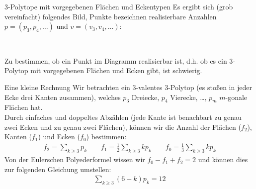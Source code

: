 \documentclass[10pt, notheorems]{beamer}
\begin{document}
\begin{frame}{$3$-Polytope mit vorgegebenen Flächen und Eckentypen}
  Es ergibt sich (grob vereinfacht) folgendes Bild, Punkte bezeichnen realisierbare Anzahlen $p = (p_3, p_4, \dots)$ und $v = (v_3, v_4, \dots)$:

  \vspace{0.5cm}
  { \centering
    \\
  }
  \vspace{0.5cm}
  \pause
  Zu bestimmen, ob ein Punkt im Diagramm realisierbar ist, d.h. ob es ein $3$-Polytop mit vorgegebenen Flächen und Ecken gibt, ist schwierig.
\end{frame}

\begin{frame}{Eine kleine Rechnung}
  Wir betrachten ein $3$-valentes $3$-Polytop (es stoßen in jeder Ecke drei Kanten zusammen), welches $p_3$ Dreiecke, $p_4$ Vierecke, \dots, $p_m$ $m$-gonale Flächen hat.\\
  \medskip
  \pause
  Durch  einfaches und doppeltes Abzählen (jede Kante ist benachbart zu genau zwei Ecken und zu genau zwei Flächen), können wir die Anzahl der Flächen ($f_2$), Kanten ($f_1$) und Ecken ($f_0$) bestimmen:
  \begin{align*}
    f_2 = \sum_{k \geq 3} p_k \qquad f_1 = \tfrac{1}{2}\sum_{k \geq 3} k p_k \qquad f_0 = \tfrac{1}{3}\sum_{k \geq 3} k p_k
  \end{align*}
  \pause
  Von der {\sc Euler}schen Polyederformel wissen wir $f_0 - f_1 + f_2 = 2$ und können dies zur folgenden Gleichung umstellen:
  \begin{align*}
    \sum_{k \geq 3} (6 - k) p_k = 12
  \end{align*}
\end{frame}
\end{document}
